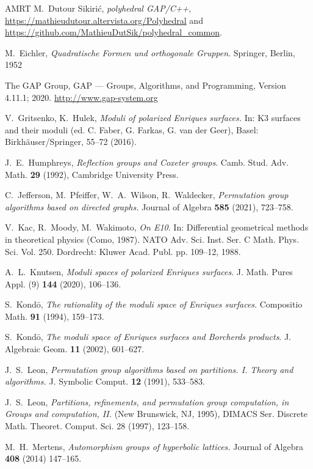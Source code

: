 \documentclass[a4paper,11pt]{article}
\begin{document}
\begin{thebibliography}{AMRT}
M.~Dutour Sikiri\'c, {\em polyhedral GAP/C++}, \url{https://mathieudutour.altervista.org/Polyhedral}
and \url{https://github.com/MathieuDutSik/polyhedral_common}.

M.~Eichler, {\em Quadratische Formen und orthogonale Gruppen}.
Springer, Berlin, 1952

The GAP Group, GAP --- Groups, Algorithms, and Programming, Version 4.11.1; 2020. \url{http://www.gap-system.org}

 V.~Gritsenko, K.~Hulek, {\it Moduli of polarized Enriques surfaces.}
In: K3 surfaces and their moduli (ed. C. Faber, G. Farkas, G. van der Geer), Basel: Birkh\"auser/Springer, 55--72 (2016).

 J.~E.~Humphreys, {\it Reflection groups and {Coxeter} groups}. Camb. Stud. Adv. Math. {\bf 29} (1992), Cambridge University Press.

C.~Jefferson, M.~Pfeiffer, W.~A.~Wilson, R.~Waldecker,
{\em Permutation group algorithms based on directed graphs.}
Journal of Algebra {\bf 585} (2021), 723--758.

V.~Kac, R.~Moody, M.~Wakimoto, {\it On E10}. In: Differential geometrical methods in theoretical physics (Como, 1987).
NATO Adv. Sci. Inst. Ser. C Math. Phys. Sci. Vol. 250. Dordrecht: Kluwer Acad. Publ. pp. 109–12, 1988.

 A.~L.~Knutsen, {\it Moduli spaces of polarized Enriques surfaces}. J. Math. Pures Appl. (9) {\bf 144} (2020), 106--136.

 S.~Kond\=o, {\it The rationality of the moduli space of Enriques surfaces}. Compositio Math. {\bf 91} (1994), 159--173.

 S.~Kond\=o, {\it The moduli space of Enriques surfaces and Borcherds products}. J. Algebraic Geom. {\bf 11} (2002), 601--627.

J.~S.~Leon, {\em Permutation group algorithms based on partitions. I. Theory and algorithms.}
J. Symbolic Comput. {\bf 12} (1991), 533--583.

J.~S.~Leon,  {\em Partitions, refinements, and permutation group computation, in Groups and computation, II.}
(New Brunswick, NJ, 1995), DIMACS Ser. Discrete Math. Theoret. Comput. Sci. 28 (1997), 123--158.

 M.~H.~Mertens, {\it Automorphism groups of hyperbolic lattices.}
Journal of Algebra {\bf 408} (2014) 147--165.


\end{thebibliography}
\end{document}
